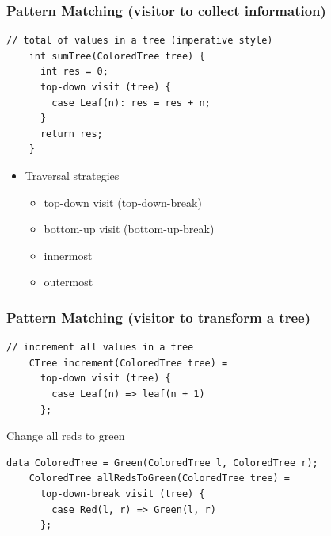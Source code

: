 \documentclass{beamer}
\begin{document}
\begin{frame}[fragile]
  \frametitle{Pattern Matching (visitor to collect information)}

    \begin{small}
      \begin{lstlisting}[language=Rascal]
    // total of values in a tree (imperative style)     
    int sumTree(ColoredTree tree) {
      int res = 0;
      top-down visit (tree) {
        case Leaf(n): res = res + n;
      }
      return res;
    }
\end{lstlisting}
\end{small}

  \begin{itemize}
    \item Traversal strategies
      \begin{itemize}
        \item top-down visit (top-down-break)
        \item bottom-up visit (bottom-up-break)
        \item innermost
        \item outermost  
      \end{itemize}  
  \end{itemize}  
\end{frame}

\begin{frame}[fragile]
  \frametitle{Pattern Matching (visitor to transform a tree)}

  \begin{lstlisting}[language=Rascal]
    // increment all values in a tree 
    CTree increment(ColoredTree tree) =
      top-down visit (tree) {
        case Leaf(n) => leaf(n + 1)
      };
    \end{lstlisting}  
  \pause

  \begin{block}{Change all reds to green}
    \begin{lstlisting}[language=Rascal]
    data ColoredTree = Green(ColoredTree l, ColoredTree r);   
    ColoredTree allRedsToGreen(ColoredTree tree) =
      top-down-break visit (tree) {
        case Red(l, r) => Green(l, r)
      };
    \end{lstlisting}  
  \end{block}
\end{frame}

\begin{frame}
\end{frame}
\end{document}

